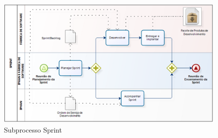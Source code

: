 \begin{anexosenv}
\begin{figure}[h]
		\centering
		\label{fig01}
			\includegraphics[scale=0.4]{figuras/subprocessoSprint.png}
		\caption{Subprocesso Sprint \cite{IPHAN:2013}}
\end{figure}

\end{anexosenv}

